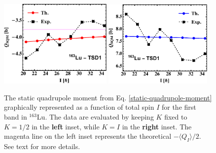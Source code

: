 \begin{figure}
    \centering
    \includegraphics[width=0.49\textwidth]{Chapters/Figures/Q_SQM_163Lu.pdf}
    \includegraphics[width=0.47\textwidth]{Chapters/Figures/Q_SQM_163Lu-2.pdf}
    \caption{The static quadrupole moment from Eq. \ref{static-quadrupole-moment} graphically represented as a function of total spin $I$ for the first band in $^{163}$Lu. The data are evaluated by keeping $K$ fixed to $K=1/2$ in the \textbf{left} inset, while $K=I$ in the \textbf{right} inset. The magenta line on the left inset represents the theoretical $-\langle Q_I\rangle/2$. See text for more details.}
    \label{static-quadrupole-fixed-K-TSD1}
\end{figure}
